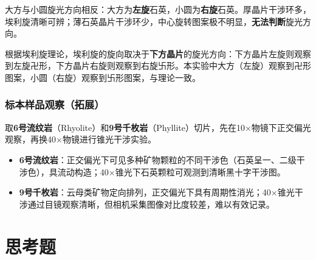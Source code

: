 \documentclass[a4paper,8pt,twocolumn]{article}
\begin{document}
大方与小圆旋光方向相反：大方为\textbf{左旋}石英，小圆为\textbf{右旋}石英。厚晶片干涉环多，埃利旋清晰可辨；薄石英晶片干涉环少，中心旋转图案极不明显，\textbf{无法判断}旋光方向。

根据埃利旋理论，埃利旋的旋向取决于\textbf{下方晶片}的旋光方向：下方晶片左旋则观察到左旋卍形，下方晶片右旋则观察到右旋卐形。本实验中大方（左旋）观察到卍形图案，小圆（右旋）观察到卐形图案，与理论一致。

\subsubsection{标本样品观察（拓展）}

取\textbf{6号流纹岩}（Rhyolite）和\textbf{9号千枚岩}（Phyllite）切片，先在10×物镜下正交偏光观察，再换40×物镜进行锥光干涉实验。

\begin{itemize}
  \item \textbf{6号流纹岩}：正交偏光下可见多种矿物颗粒的不同干涉色（石英呈一、二级干涉色），具流动构造；40×锥光下石英颗粒可观测到清晰黑十字干涉图。
  \item \textbf{9号千枚岩}：云母类矿物定向排列，正交偏光下具有周期性消光；40×锥光干涉通过目镜观察清晰，但相机采集图像对比度较差，难以有效记录。
\end{itemize}

\section{思考题}
\end{document}
